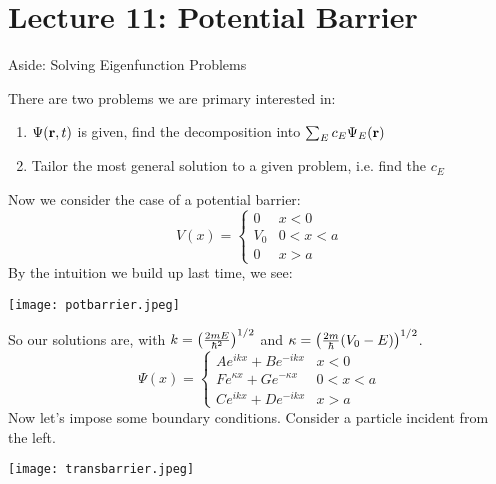 \section{Lecture 11: Potential Barrier}

Aside: Solving Eigenfunction Problems

There are two problems we are primary interested in:
\begin{enumerate}
    \item $\Psi(\mathbf{r}, t)$ is given, find the decomposition into $\sum_E c_E \Psi_E(\mathbf{r})$
    \item Tailor the most general solution to a given problem, i.e. find the $c_E$
\end{enumerate}

Now we consider the case of a potential barrier:
\[ V(x) = \begin{cases}
    0 & x < 0 \\ V_0 & 0 < x < a \\ 0 & x > a
\end{cases} \]
By the intuition we build up last time, we see:

\texttt{[image: potbarrier.jpeg]}

So our solutions are, with $k = \qty(\frac{2mE}{\hbar^2})^{1/2}$ and $\kappa = \qty(\frac{2m}{\hbar}(V_0 - E))^{1/2}$.
\[ \Psi(x) = \begin{cases}
    Ae^{ikx} + Be^{-ikx} & x < 0 \\
    Fe^{\kappa x} + Ge^{-\kappa x} & 0 < x < a \\
    Ce^{ikx} + De^{-ikx} & x > a
\end{cases} \]
Now let's impose some boundary conditions. Consider a particle incident from the left.

\texttt{[image: transbarrier.jpeg]}

